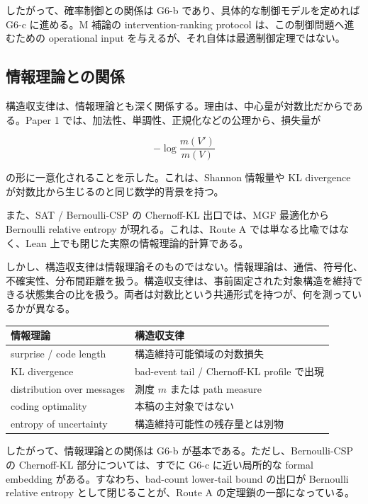 \documentclass[12pt,a4paper]{article}
\begin{document}
したがって、確率制御との関係は G6-b であり、具体的な制御モデルを定めれば G6-c に進める。M 補論の intervention-ranking protocol は、この制御問題へ進むための operational input を与えるが、それ自体は最適制御定理ではない。

\subsection{情報理論との関係}\label{ux60c5ux5831ux7406ux8ad6ux3068ux306eux95a2ux4fc2}

構造収支律は、情報理論とも深く関係する。理由は、中心量が対数比だからである。Paper 1 では、加法性、単調性、正規化などの公理から、損失量が

\[
-\log \frac{m(V')}{m(V)}
\]

の形に一意化されることを示した。これは、Shannon 情報量や KL divergence が対数比から生じるのと同じ数学的背景を持つ。

また、SAT / Bernoulli-CSP の Chernoff-KL 出口では、MGF 最適化から Bernoulli relative entropy が現れる。これは、Route A では単なる比喩ではなく、Lean 上でも閉じた実際の情報理論的計算である。

しかし、構造収支律は情報理論そのものではない。情報理論は、通信、符号化、不確実性、分布間距離を扱う。構造収支律は、事前固定された対象構造を維持できる状態集合の比を扱う。両者は対数比という共通形式を持つが、何を測っているかが異なる。

{\def\LTcaptype{table} %
\begin{longtable}[]{@{}ll@{}}
\toprule\noalign{}
情報理論 & 構造収支律 \\
\midrule\noalign{}
\endhead
\bottomrule\noalign{}
\endlastfoot
surprise / code length & 構造維持可能領域の対数損失 \\
KL divergence & bad-event tail / Chernoff-KL profile で出現 \\
distribution over messages & 測度 \(m\) または path measure \\
coding optimality & 本稿の主対象ではない \\
entropy of uncertainty & 構造維持可能性の残存量とは別物 \\
\end{longtable}
}

したがって、情報理論との関係は G6-b が基本である。ただし、Bernoulli-CSP の Chernoff-KL 部分については、すでに G6-c に近い局所的な formal embedding がある。すなわち、bad-count lower-tail bound の出口が Bernoulli relative entropy として閉じることが、Route A の定理鎖の一部になっている。
\end{document}
